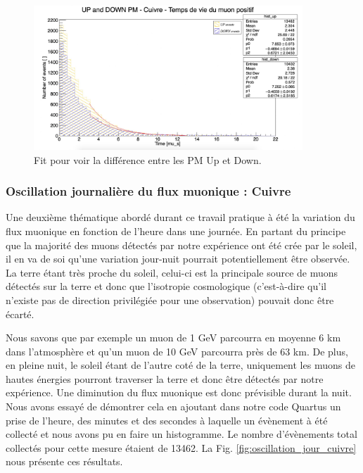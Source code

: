 \documentclass[12pt]{article}
\begin{document}
\begin{figure}[htpb!]
    \centering
    \includegraphics[width=0.9\textwidth]{Images/Photos/FitUpDown.jpeg}
    \caption{Fit pour voir la différence entre les PM Up et Down.}
    \label{fig:FitUpDown}
\end{figure}

\subsubsection{Oscillation journalière du flux muonique : Cuivre}

Une deuxième thématique abordé durant ce travail pratique à été la variation du flux muonique en fonction de l'heure dans une journée. En partant du principe que la majorité des muons détectés par notre expérience ont été crée par le soleil, il en va de soi qu'une variation jour-nuit pourrait potentiellement être observée. La terre étant très proche du soleil, celui-ci est la principale source de muons détectés sur la terre et donc que l'isotropie cosmologique (c'est-à-dire qu'il n'existe pas de direction privilégiée pour une observation) pouvait donc être écarté.

Nous savons que par exemple un muon de 1 GeV parcourra en moyenne 6 km dans l'atmosphère et qu'un muon de 10 GeV parcourra près de 63 km. De plus, en pleine nuit, le soleil étant de l'autre coté de la terre, uniquement les muons de hautes énergies pourront traverser la terre et donc être détectés par notre expérience. Une diminution du flux muonique est donc prévisible durant la nuit. Nous avons essayé de démontrer cela en ajoutant dans notre code Quartus un prise de l'heure, des minutes et  des secondes à laquelle un évènement à été collecté et nous avons pu en faire un histogramme. Le nombre d'évènements total collectés pour cette mesure étaient de 13462. La Fig. \ref{fig:oscillation_jour_cuivre} nous présente ces résultats.
\end{document}
